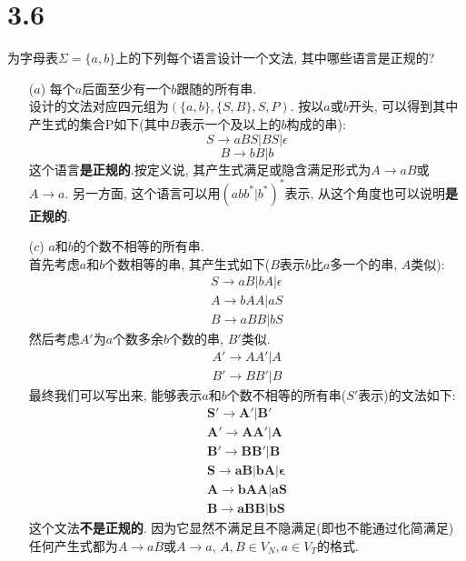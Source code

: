 \documentclass[UTF8]{article}
\begin{document}
\section*{3.6}
\noindent 为字母表$\Sigma=\{a,b\}$上的下列每个语言设计一个文法, 其中哪些语言是正规的?
\begin{enumerate}
\item[($a$) ] 每个$a$后面至少有一个$b$跟随的所有串.\\
	设计的文法对应四元组为$(\{a,b\},\{S,B\}, S, P)$. 按以$a$或$b$开头, 可以得到其中产生式的集合P如下(其中$B$表示一个及以上的$b$构成的串): 
	$$S \rightarrow aBS|BS|\epsilon$$
	$$B \rightarrow bB|b$$
	这个语言\textbf{是正规的}.按定义说, 其产生式满足或隐含满足形式为$A\rightarrow aB$或$A\rightarrow a$. 另一方面, 这个语言可以用$(abb^*|b^*)^*$表示, 从这个角度也可以说明\textbf{是正规的}.
\item[($c$) ] {$a$和$b$的个数不相等的所有串.}\\
	首先考虑$a$和$b$个数相等的串, 其产生式如下($B$表示$b$比$a$多一个的串, $A$类似):
	$$\begin{array}{l}
	S\rightarrow aB|bA|\epsilon\\
	A\rightarrow bAA|aS\\
	B\rightarrow aBB|bS
	\end{array}$$
	然后考虑$A'$为$a$个数多余$b$个数的串, $B'$类似.
	$$\begin{array}{l}
	A'\rightarrow AA'|A\\
	B'\rightarrow BB'|B
	\end{array}$$
	最终我们可以写出来, 能够表示$a$和$b$个数不相等的所有串($S'$表示)的文法如下:
	$$\begin{array}{l}
	\bm{S'\rightarrow A'|B'}\\
	\bm{A'\rightarrow AA'|A}\\
	\bm{B'\rightarrow BB'|B}\\
	\bm{S\rightarrow aB|bA|\epsilon}\\
	\bm{A\rightarrow bAA|aS}\\
	\bm{B\rightarrow aBB|bS}
	\end{array}$$
	这个文法\textbf{不是正规的}. 因为它显然不满足且不隐满足(即也不能通过化简满足)任何产生式都为$A\rightarrow aB$或$A\rightarrow a$, $A,B\in V_N,a\in V_T$的格式.
	
\end{enumerate}
\end{document}
